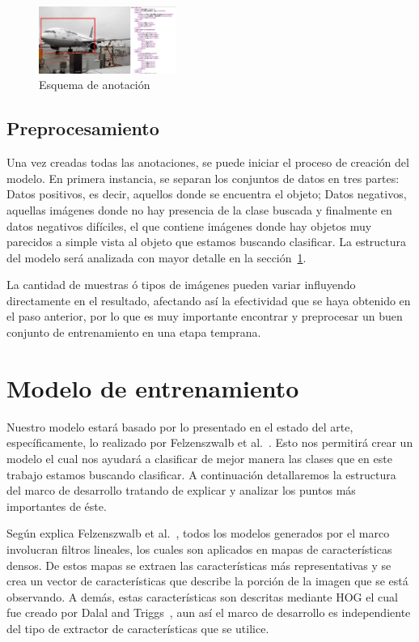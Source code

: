\begin{figure}[tb]
  \centering
   \includegraphics[width=0.4\textwidth]{Figuras/plain-1.jpg}
   \caption{Esquema de anotación}
   \label{fig:anota}
\end{figure}

\subsection{Preprocesamiento}\label{subsec:pre}
Una vez creadas todas las anotaciones, se puede iniciar el proceso de creación del modelo. En primera instancia, se separan los conjuntos de datos en tres partes: Datos positivos, es decir, aquellos donde se encuentra el objeto; Datos negativos, aquellas imágenes donde no hay presencia de la clase buscada y finalmente en datos negativos difíciles, el que contiene imágenes donde hay objetos muy parecidos a simple vista al objeto que estamos buscando clasificar. La estructura del modelo será analizada con mayor detalle en la sección~\ref{sec:model}.

La cantidad de muestras ó tipos de imágenes pueden variar influyendo directamente en el resultado, afectando así la efectividad que se haya obtenido en el paso anterior, por lo que es muy importante encontrar y preprocesar un buen conjunto de entrenamiento en una etapa temprana.

\section{Modelo de entrenamiento}\label{sec:model}
Nuestro modelo estará basado por lo presentado en el estado del arte, específicamente, lo realizado por Felzenszwalb et al.~\cite{Felzenszwalb2010}. Esto nos permitirá crear un modelo el cual nos ayudará a clasificar de mejor manera las clases que en este trabajo estamos buscando clasificar. A continuación detallaremos la estructura del marco de desarrollo tratando de explicar y analizar los puntos más importantes de éste.

Según explica Felzenszwalb et al.~\cite{Felzenszwalb2010}, todos los modelos generados por el marco involucran filtros lineales, los cuales son aplicados en mapas de características densos. De estos mapas se extraen las características más representativas y se crea un vector de características que describe la porción de la imagen que se está observando. A demás, estas características son descritas mediante HOG el cual fue creado por Dalal and Triggs~\cite{Dalal2005}, aun así el marco de desarrollo es independiente del tipo de extractor de características que se utilice.

